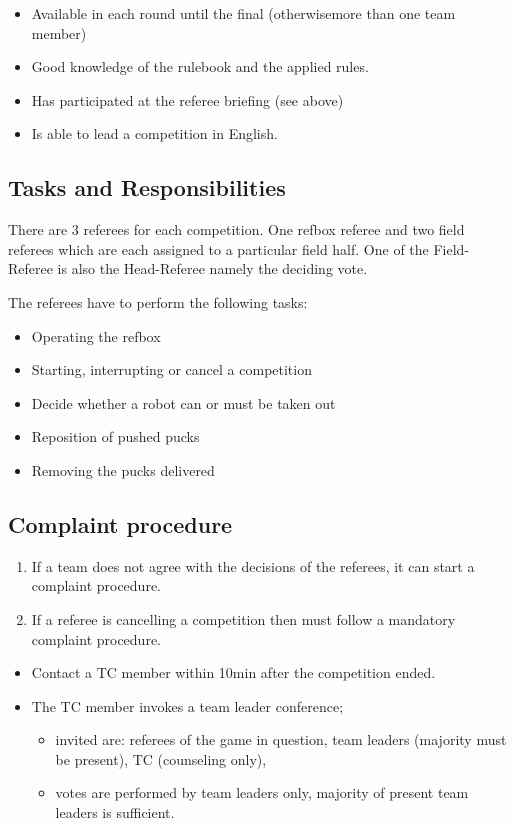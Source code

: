 \documentclass[12pt,twoside]{article}
\begin{document}
\begin{itemize}
  \item Available in each round until the final (otherwisemore than one team member)
  \item Good knowledge of the rulebook and the applied rules.
  \item Has participated at the referee briefing (see above)
  \item Is able to lead a competition in English.
\end{itemize}

\subsection{Tasks and Responsibilities}
There are 3 referees for each competition. 
One refbox referee and two field referees which are each assigned to a particular field half. One of the Field-Referee is also the Head-Referee namely the deciding vote. 

The referees have to perform the following tasks:
\begin{itemize}
  \item Operating the refbox
  \item Starting, interrupting or cancel a competition
  \item Decide whether a robot can or must be taken out 
  \item Reposition of pushed pucks
  \item Removing the pucks delivered
\end{itemize}

\subsection{Complaint procedure}
\begin{enumerate}
\item If a team does not agree with the decisions of the referees, it can start a complaint procedure.
\item If a referee is cancelling a competition then must follow a mandatory complaint procedure.
\end{enumerate}
\begin{itemize}
\item Contact a TC member within 10min after the competition ended.
\item The TC member invokes a team leader conference; 
\begin{itemize}
\item invited are: referees of the game in question, team leaders (majority must be present), TC (counseling only), 
\item votes are performed by team leaders only, majority of present team leaders is sufficient.
\end{itemize}
\end{itemize}
\end{document}
